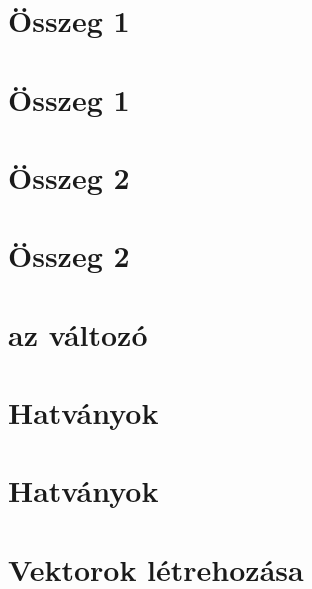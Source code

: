\begin{spacing}{1.4}
\section*{Összeg 1} \label{DBmatlabia2}
\Fa{

}
\vspace{0.5cm}
\newpage
\section*{Összeg 1} \label{DBmatlabia2Mo}
\Mo{

}
\vspace{0.5cm}
\newpage
\section*{Összeg 2} \label{DBmatlabia3}
\Fa{

}
\vspace{0.5cm}
\newpage
\section*{Összeg 2} \label{DBmatlabia3Mo}
\Mo{

}
\vspace{0.5cm}
\newpage
\section*{az  változó} \label{DBmatlabia4}
\Desc{

}
\vspace{0.5cm}
\newpage
\section*{Hatványok} \label{DBmatlabia5}
\Fa{

}
\vspace{0.5cm}
\newpage
\section*{Hatványok} \label{DBmatlabia5Mo}
\Mo{

}
\vspace{0.5cm}
\newpage
\section*{Vektorok létrehozása} \label{DBmatlabia6}
\Desc{

}
\vspace{0.5cm}
\newpage

\end{spacing}
